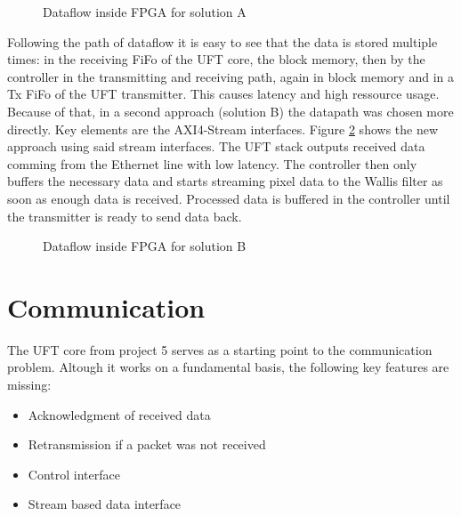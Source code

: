 \begin{figure}[t!]
    \centering
    \begin{adjustbox}{max width=\textwidth}
        
    \end{adjustbox}
    \caption{Dataflow inside FPGA for solution A}
    \label{fig:dataflowa}
\end{figure}

Following the path of dataflow it is easy to see that the data is stored
multiple
times: in the receiving FiFo of the UFT core, the block memory, then by the
controller in the transmitting and receiving path, again in block memory and in
a Tx FiFo of the UFT transmitter. This causes latency and high ressource usage.
Because of that, in a second approach (solution B) the datapath was chosen more
directly. Key elements are the AXI4-Stream interfaces. Figure \ref{fig:dataflowb}
shows the new approach using said stream interfaces. The UFT stack outputs
received data comming from the Ethernet line with low latency. The controller
then only buffers the necessary data and starts streaming pixel data to the
Wallis filter as soon as enough data is received. Processed data is buffered in
the controller until the transmitter is ready to send data back.

\begin{figure}[b!]
    \centering
    \begin{adjustbox}{max width=\textwidth}
        
    \end{adjustbox}
    \caption{Dataflow inside FPGA for solution B}
    \label{fig:dataflowb}
\end{figure}

\section{Communication}
The UFT core from project 5 serves as a starting point to the communication
problem. Altough it works on a fundamental basis, the following key features are
missing:

\begin{itemize}
	\item Acknowledgment of received data
	\item Retransmission if a packet was not received
	\item Control interface
	\item Stream based data interface
\end{itemize}

